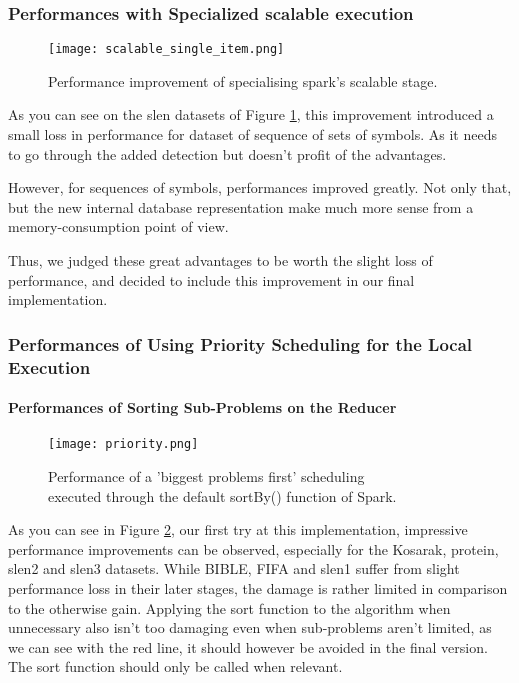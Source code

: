 \documentclass{eplmastersthesis}
\begin{document}
\subsubsection{Performances with Specialized scalable execution}

\begin{figure}[h]
  \centering
  \texttt{[image: scalable\_single\_item.png]}
  \caption{Performance improvement of specialising spark's scalable stage.}
  \label{fig:scalable_single_item}
\end{figure}

As you can see on the slen datasets of Figure \ref{fig:scalable_single_item}, this improvement introduced a small loss in performance for dataset of sequence of sets of symbols. As it needs to go through the added detection but doesn't profit of the advantages. \newline

However, for sequences of symbols, performances improved greatly. Not only that, but the new internal database representation make much more sense from a memory-consumption point of view. \newline

Thus, we judged these great advantages to be worth the slight loss of performance, and decided to include this improvement in our final implementation.

\subsubsection{Performances of Using Priority Scheduling for the Local Execution}

\paragraph{Performances of Sorting Sub-Problems on the Reducer}

\begin{figure}[h]
  \centering
  \texttt{[image: priority.png]}
  \caption[Naive priority scheduling]{
  		Performance of a 'biggest problems first' scheduling \\
  		executed through the default sortBy() function of Spark.
  	\endtabular
  }
  \label{fig:priority_scheduling_performance_comparison}
\end{figure}

As you can see in Figure \ref{fig:priority_scheduling_performance_comparison}, our first try at this implementation, impressive performance improvements can be observed, especially for the Kosarak, protein, slen2 and slen3 datasets. While BIBLE, FIFA and slen1 suffer from slight performance loss in their later stages, the damage is rather limited in comparison to the otherwise gain. Applying the sort function to the algorithm when unnecessary also isn't too damaging even when sub-problems aren't limited, as we can see with the red line, it should however be avoided in the final version. The sort function should only be called when relevant.\newline
\end{document}
